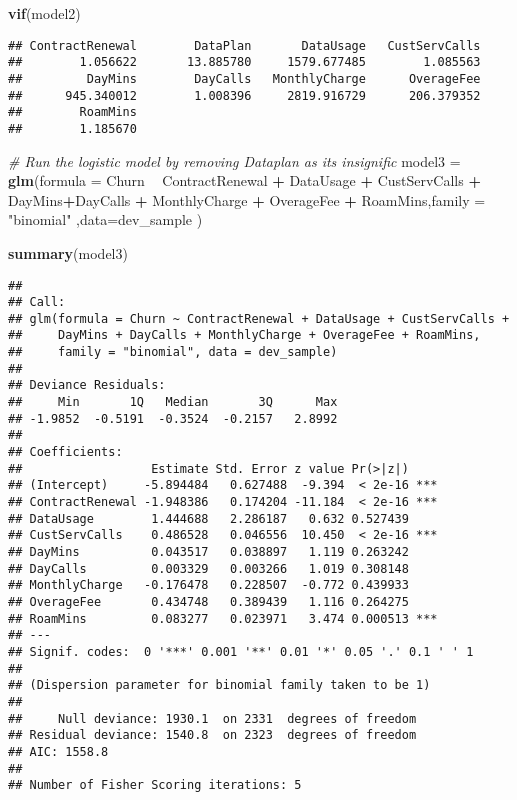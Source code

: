 \documentclass[]{article}
\newenvironment{Shaded}{\begin{snugshade}}{\end{snugshade}}
\newcommand{\KeywordTok}[1]{\textcolor[rgb]{0.13,0.29,0.53}{\textbf{#1}}}
\newcommand{\DataTypeTok}[1]{\textcolor[rgb]{0.13,0.29,0.53}{#1}}
\newcommand{\StringTok}[1]{\textcolor[rgb]{0.31,0.60,0.02}{#1}}
\newcommand{\CommentTok}[1]{\textcolor[rgb]{0.56,0.35,0.01}{\textit{#1}}}
\newcommand{\OperatorTok}[1]{\textcolor[rgb]{0.81,0.36,0.00}{\textbf{#1}}}
\newcommand{\NormalTok}[1]{#1}
\begin{document}
\begin{Shaded}
\begin{Highlighting}[]
\KeywordTok{vif}\NormalTok{(model2)}
\end{Highlighting}
\end{Shaded}

\begin{verbatim}
## ContractRenewal        DataPlan       DataUsage   CustServCalls 
##        1.056622       13.885780     1579.677485        1.085563 
##         DayMins        DayCalls   MonthlyCharge      OverageFee 
##      945.340012        1.008396     2819.916729      206.379352 
##        RoamMins 
##        1.185670
\end{verbatim}

\begin{Shaded}
\begin{Highlighting}[]
  \CommentTok{# Run the logistic model by removing Dataplan as its insignific}
\NormalTok{  model3 =}\StringTok{ }\KeywordTok{glm}\NormalTok{(}\DataTypeTok{formula =}\NormalTok{ Churn }\OperatorTok{~}\StringTok{    }\NormalTok{ContractRenewal }\OperatorTok{+}\StringTok{  }\NormalTok{DataUsage }\OperatorTok{+}\StringTok{ }\NormalTok{CustServCalls }\OperatorTok{+}\StringTok{ }\NormalTok{DayMins}\OperatorTok{+}\NormalTok{DayCalls }\OperatorTok{+}\StringTok{ }\NormalTok{MonthlyCharge }\OperatorTok{+}\StringTok{ }\NormalTok{OverageFee }\OperatorTok{+}\StringTok{ }\NormalTok{RoamMins,}\DataTypeTok{family =} \StringTok{"binomial"}\NormalTok{ ,}\DataTypeTok{data=}\NormalTok{dev_sample )}

  \KeywordTok{summary}\NormalTok{(model3)  }
\end{Highlighting}
\end{Shaded}

\begin{verbatim}
## 
## Call:
## glm(formula = Churn ~ ContractRenewal + DataUsage + CustServCalls + 
##     DayMins + DayCalls + MonthlyCharge + OverageFee + RoamMins, 
##     family = "binomial", data = dev_sample)
## 
## Deviance Residuals: 
##     Min       1Q   Median       3Q      Max  
## -1.9852  -0.5191  -0.3524  -0.2157   2.8992  
## 
## Coefficients:
##                  Estimate Std. Error z value Pr(>|z|)    
## (Intercept)     -5.894484   0.627488  -9.394  < 2e-16 ***
## ContractRenewal -1.948386   0.174204 -11.184  < 2e-16 ***
## DataUsage        1.444688   2.286187   0.632 0.527439    
## CustServCalls    0.486528   0.046556  10.450  < 2e-16 ***
## DayMins          0.043517   0.038897   1.119 0.263242    
## DayCalls         0.003329   0.003266   1.019 0.308148    
## MonthlyCharge   -0.176478   0.228507  -0.772 0.439933    
## OverageFee       0.434748   0.389439   1.116 0.264275    
## RoamMins         0.083277   0.023971   3.474 0.000513 ***
## ---
## Signif. codes:  0 '***' 0.001 '**' 0.01 '*' 0.05 '.' 0.1 ' ' 1
## 
## (Dispersion parameter for binomial family taken to be 1)
## 
##     Null deviance: 1930.1  on 2331  degrees of freedom
## Residual deviance: 1540.8  on 2323  degrees of freedom
## AIC: 1558.8
## 
## Number of Fisher Scoring iterations: 5
\end{verbatim}
\end{document}
